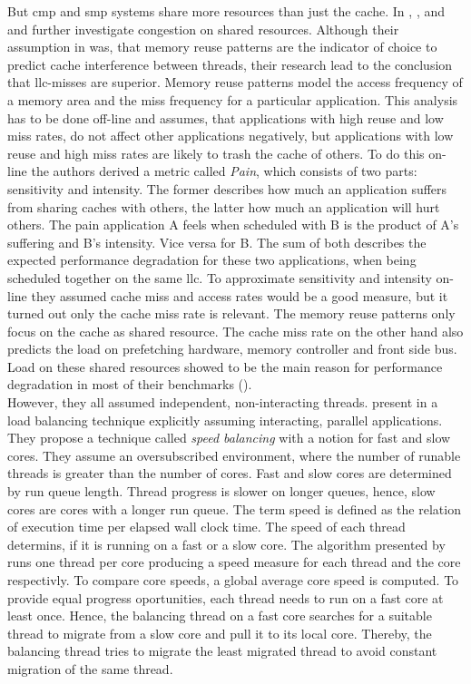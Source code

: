 But \gls{cmp} and \gls{smp} systems share more resources than just the cache.
In \cite{fedorova_managing_2010}, \cite{zhuravlev_addressing_2010}, and
\cite{zhuravlev_survey_2012} \citeauthor{fedorova_managing_2010} and
\citeauthor{zhuravlev_addressing_2010} further investigate congestion on shared
resources.
Although their assumption in \cite{fedorova_managing_2010} was, that memory
reuse patterns are the indicator of
choice to predict cache interference between threads, their research lead to
the conclusion that \gls{llc}-misses are superior.
Memory reuse patterns model the access frequency of a memory area and the miss
frequency for a particular application.
This analysis has to be done off-line and assumes, that applications with high
reuse and low miss rates, do not affect other applications negatively, but
applications with low reuse and high miss rates are likely to trash the cache
of others.
To do this on-line the authors derived a metric called \emph{Pain}, which
consists of two parts: sensitivity and intensity.
The former describes how much an application suffers from sharing caches with
others, the latter how much an application will hurt others.
The pain application A feels when scheduled with B is the product of A's
suffering and B's intensity.
Vice versa for B.
The sum of both describes the expected performance degradation for these two
applications, when being scheduled together on the same \gls{llc}.
To approximate sensitivity and intensity on-line they assumed cache miss and
access rates would be a good measure, but it turned out only the cache miss
rate is relevant.
The memory reuse patterns only focus on the cache as shared resource.
The cache miss rate on the other hand also predicts the load on prefetching
hardware, memory controller and front side bus.
Load on these shared resources showed to be the main reason for performance
degradation in most of their benchmarks (\cite{zhuravlev_addressing_2010}).
\\

However, they all assumed independent, non-interacting threads.
\citeauthor{hofmeyr_load_2010} present in \cite{hofmeyr_load_2010} a load
balancing technique explicitly assuming interacting, parallel applications.
They propose a technique called \emph{speed balancing} with a notion for fast
and slow cores.
They assume an oversubscribed environment, where the number of runable threads
is greater than the number of cores.
Fast and slow cores are determined by run queue length.
Thread progress is slower on longer queues, hence, slow cores are cores with a
longer run queue.
The term speed is defined as the relation of execution time per elapsed wall
clock time.
The speed of each thread determins, if it is running on a fast or a slow core.
The algorithm presented by \citeauthor{hofmeyr_load_2010} runs one thread per
core producing a speed measure for each thread and the core respectivly.
To compare core speeds, a global average core speed is computed.
To provide equal progress oportunities, each thread needs to run on a fast
core at least once.
Hence, the balancing thread on a fast core searches for a suitable thread to
migrate from a slow core and pull it to its local core.
Thereby, the balancing thread tries to migrate the least migrated thread to
avoid constant migration of the same thread.

